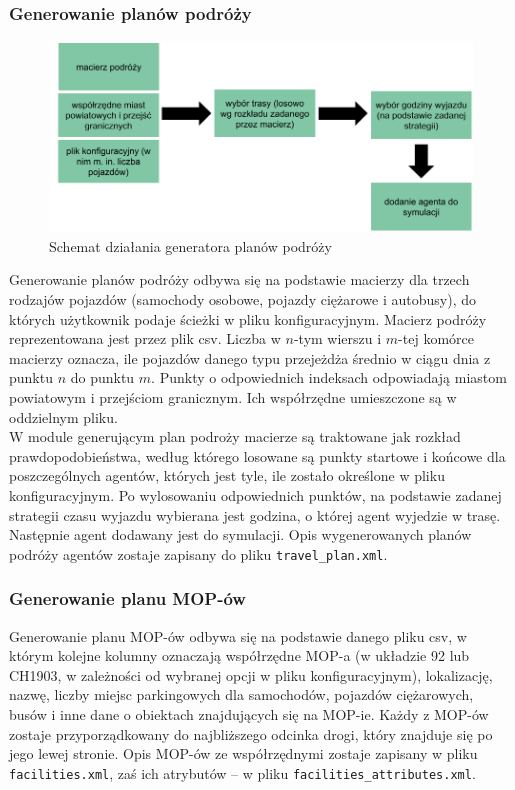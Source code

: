 \subsubsection{Generowanie planów podróży}
    \begin{figure}[h]
        \caption{Schemat działania generatora planów podróży}
        \includegraphics[width=\textwidth]{images/mopsim/mopsim-travelplan.png}
    \end{figure}
Generowanie planów podróży odbywa się na podstawie macierzy dla trzech rodzajów pojazdów (samochody osobowe, pojazdy ciężarowe i autobusy), do których użytkownik podaje ścieżki w pliku konfiguracyjnym. Macierz podróży reprezentowana jest przez plik csv. Liczba w $n$-tym wierszu i $m$-tej komórce macierzy oznacza, ile pojazdów danego typu przejeżdża średnio w ciągu dnia z punktu $n$ do punktu $m$. Punkty o odpowiednich indeksach odpowiadają miastom powiatowym i przejściom granicznym. Ich współrzędne umieszczone są w oddzielnym pliku.\\
W module generującym plan podroży macierze są traktowane jak rozkład prawdopodobieństwa, według którego losowane są punkty startowe i końcowe dla poszczególnych agentów, których jest tyle, ile zostało określone w pliku konfiguracyjnym. Po wylosowaniu odpowiednich punktów, na podstawie zadanej strategii czasu wyjazdu wybierana jest godzina, o której agent wyjedzie w trasę. Następnie agent dodawany jest do symulacji. Opis wygenerowanych planów podróży agentów zostaje zapisany do pliku \texttt{travel\_plan.xml}.
\newpage
\subsubsection{Generowanie planu MOP-ów}
Generowanie planu MOP-ów odbywa się na podstawie danego pliku csv, w którym kolejne kolumny oznaczają współrzędne MOP-a (w układzie 92 lub CH1903, w zależności od wybranej opcji w pliku konfiguracyjnym), lokalizację, nazwę, liczby miejsc parkingowych dla samochodów, pojazdów ciężarowych, busów i inne dane o obiektach znajdujących się na MOP-ie. Każdy z MOP-ów zostaje przyporządkowany do najbliższego odcinka drogi, który znajduje się po jego lewej stronie. Opis MOP-ów ze współrzędnymi zostaje zapisany w pliku \texttt{facilities.xml}, zaś ich atrybutów -- w pliku \texttt{facilities\_attributes.xml}.
